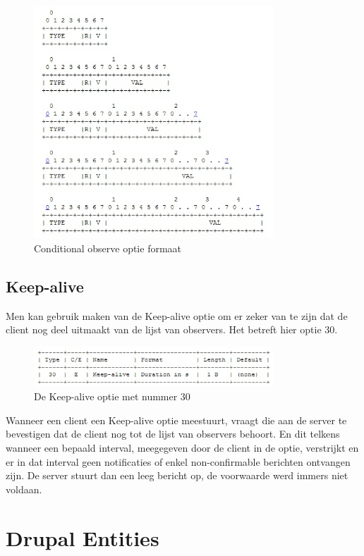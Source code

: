 \begin{figure}[h!]
\label{fig:conditionalFormat}
\centering
\includegraphics[width=0.8\textwidth]{fig/conditional_format}
\caption{Conditional observe optie formaat }
\end{figure}

\subsection{Keep-alive}
Men kan gebruik maken van de Keep-alive optie om er zeker van te zijn dat de client nog deel uitmaakt van de lijst van observers. Het betreft hier optie 30.

\begin{figure}[h!]
\label{fig:keepAlive}
\centering
\includegraphics[width=0.8\textwidth]{fig/keep_alive}
\caption{De Keep-alive optie met nummer 30}
\end{figure}

Wanneer een client een Keep-alive optie meestuurt, vraagt die aan de server te bevestigen dat de client nog tot de lijst van observers behoort. En dit telkens wanneer een bepaald interval, meegegeven door de client in de optie, verstrijkt en er in dat interval geen notificaties of enkel non-confirmable berichten ontvangen zijn. De server stuurt dan een leeg bericht op, de voorwaarde werd immers niet voldaan.

\section{Drupal Entities}
